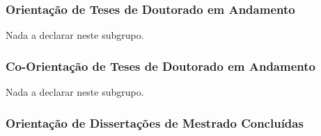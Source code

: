 \documentclass[a4paper,oneside,10pt]{article}
\begin{document}

\subsubsection{Orienta\c{c}\~{a}o de Teses de Doutorado em Andamento}
\vspace{0.3cm}

Nada a declarar neste subgrupo.
%
%


\subsubsection{Co-Orienta\c{c}\~{a}o de Teses de Doutorado em Andamento}
\vspace{0.3cm}

Nada a declarar neste subgrupo.
%
%


\subsubsection{Orienta\c{c}\~{a}o de Disserta\c{c}\~{o}es de Mestrado Conclu\'{i}das}
\vspace{0.3cm}
\end{document}
